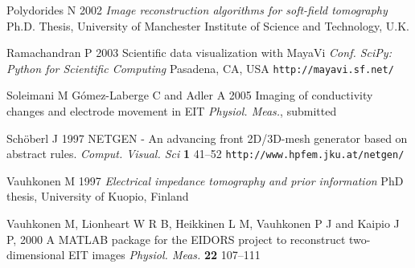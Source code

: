 \documentclass[12pt]{iopart}
\begin{document}
\begin{thebibliography}{99}
Polydorides N 
2002
{\it Image reconstruction algorithms for soft-field tomography}
Ph.D. Thesis,
University of Manchester Institute of Science and Technology, U.K. 

Ramachandran P 2003
Scientific data visualization with MayaVi
{\it Conf. SciPy: Python for Scientific Computing}
Pasadena, CA, USA
{\tt http://mayavi.sf.net/}

Soleimani M G\'omez-Laberge C and Adler A 2005
Imaging of conductivity changes and electrode movement in EIT
{\it Physiol. Meas.}, submitted

Sch\"oberl J 1997
NETGEN - An advancing front 2D/3D-mesh generator based on abstract rules.
{\it Comput. Visual. Sci} {\bf 1} 41--52
{\tt http://www.hpfem.jku.at/netgen/}

Vauhkonen M 
1997
{\it Electrical impedance tomography and prior information}
PhD thesis, University of Kuopio, Finland 

Vauhkonen M,
Lionheart W R B,
Heikkinen L M,
Vauhkonen P J and
Kaipio J P, 
2000
A MATLAB package for the EIDORS project to reconstruct
two-dimensional EIT images
{\it Physiol. Meas.} {\bf 22} 107--111 

\end{thebibliography}
\end{document}

